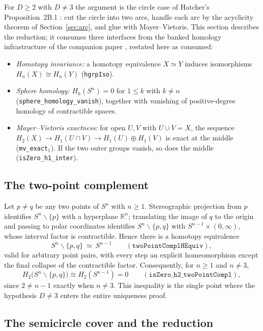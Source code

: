 \documentclass[11pt]{article}
\theoremstyle{definition}
\newcommand{\R}{\mathbb{R}}
\newcommand{\Sph}[1]{S^{#1}}
\newcommand{\lean}[1]{\texttt{#1}}
\begin{document}
For $D \geq 2$ with $D \neq 3$ the argument is the circle case of Hatcher's Proposition~2B.1 \cite{hatcher}: cut the circle into two arcs, handle each arc by the acyclicity theorem of Section~\ref{sec:arc}, and glue with Mayer--Vietoris. This section describes the reduction; it consumes three interfaces from the banked homology infrastructure of the companion paper \cite{companion}, restated here as consumed:

\begin{itemize}
\item \emph{Homotopy invariance:} a homotopy equivalence $X \simeq Y$ induces isomorphisms $H_n(X) \cong H_n(Y)$ (\lean{hgrpIso}).
\item \emph{Sphere homology:} $H_k(\Sph{n}) = 0$ for $1 \le k$ with $k \neq n$ (\lean{sphere\_homology\_vanish}), together with vanishing of positive-degree homology of contractible spaces.
\item \emph{Mayer--Vietoris exactness:} for open $U, V$ with $U \cup V = X$, the sequence $H_2(X) \to H_1(U \cap V) \to H_1(U) \oplus H_1(V)$ is exact at the middle (\lean{mv\_exact}$_1$). If the two outer groups vanish, so does the middle (\lean{isZero\_h1\_inter}).
\end{itemize}

\subsection{The two-point complement}

Let $p \neq q$ be any two points of $\Sph{n}$ with $n \geq 1$. Stereographic projection from $p$ identifies $\Sph{n} \smallsetminus \{p\}$ with a hyperplane $\R^{n}$; translating the image of $q$ to the origin and passing to polar coordinates identifies $\Sph{n} \smallsetminus \{p, q\}$ with $\Sph{n-1} \times (0, \infty)$, whose interval factor is contractible. Hence there is a homotopy equivalence
\[
\Sph{n} \smallsetminus \{p, q\} \ \simeq\ \Sph{n-1}
\qquad (\lean{twoPointComplHEquiv}),
\]
valid for arbitrary point pairs, with every step an explicit homeomorphism except the final collapse of the contractible factor. Consequently, for $n \geq 1$ and $n \neq 3$,
\[
H_2\bigl(\Sph{n} \smallsetminus \{p, q\}\bigr) \cong H_2(\Sph{n-1}) = 0
\qquad (\lean{isZero\_h2\_twoPointCompl}),
\]
since $2 \neq n - 1$ exactly when $n \neq 3$. This inequality is the single point where the hypothesis $D \neq 3$ enters the entire uniqueness proof.

\subsection{The semicircle cover and the reduction}
\end{document}
